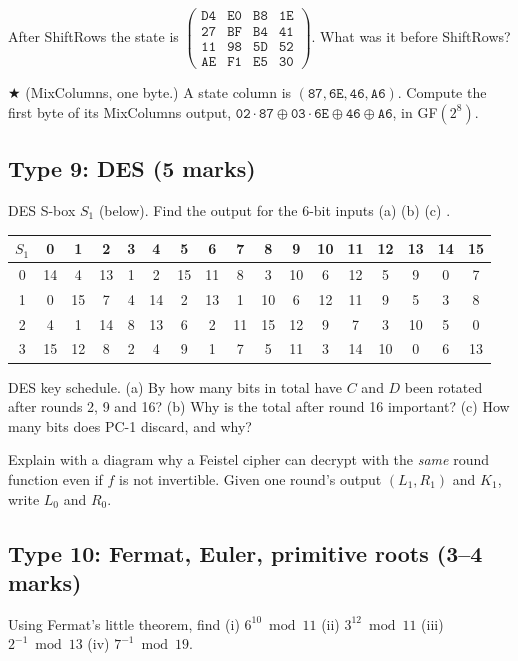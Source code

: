  After ShiftRows the state is $\begin{pmatrix}\mathtt{D4}&\mathtt{E0}&\mathtt{B8}&\mathtt{1E}\\\mathtt{27}&\mathtt{BF}&\mathtt{B4}&\mathtt{41}\\\mathtt{11}&\mathtt{98}&\mathtt{5D}&\mathtt{52}\\\mathtt{AE}&\mathtt{F1}&\mathtt{E5}&\mathtt{30}\end{pmatrix}$. What was it before ShiftRows?

 $\bigstar$ (MixColumns, one byte.) A state column is $(\mathtt{87}, \mathtt{6E}, \mathtt{46}, \mathtt{A6})$. Compute the first byte of its MixColumns output, $\mathtt{02}\cdot\mathtt{87} \oplus \mathtt{03}\cdot\mathtt{6E} \oplus \mathtt{46} \oplus \mathtt{A6}$, in GF$(2^8)$.

\subsection*{Type 9: DES (5 marks)}
 DES S-box $S_1$ (below). Find the output for the 6-bit inputs (a)  (b)  (c) .
\begin{center}\scriptsize\setlength{\tabcolsep}{2.5pt}
\begin{tabular}{c|*{16}{c}}
$S_1$ & 0&1&2&3&4&5&6&7&8&9&10&11&12&13&14&15\\\hline
0 & 14&4&13&1&2&15&11&8&3&10&6&12&5&9&0&7\\
1 & 0&15&7&4&14&2&13&1&10&6&12&11&9&5&3&8\\
2 & 4&1&14&8&13&6&2&11&15&12&9&7&3&10&5&0\\
3 & 15&12&8&2&4&9&1&7&5&11&3&14&10&0&6&13
\end{tabular}
\end{center}

 DES key schedule. (a) By how many bits in total have $C$ and $D$ been rotated after rounds 2, 9 and 16? (b) Why is the total after round 16 important? (c) How many bits does PC-1 discard, and why?

 Explain with a diagram why a Feistel cipher can decrypt with the \emph{same} round function even if $f$ is not invertible. Given one round's output $(L_1, R_1)$ and $K_1$, write $L_0$ and $R_0$.


\subsection*{Type 10: Fermat, Euler, primitive roots (3--4 marks)}
 Using Fermat's little theorem, find (i) $6^{10} \bmod 11$ (ii) $3^{12} \bmod 11$ (iii) $2^{-1} \bmod 13$ (iv) $7^{-1} \bmod 19$.

